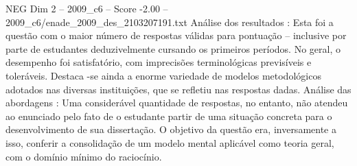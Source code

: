 \begin{textsample}{NEG Dim 2 – 2009\_c6 – Score -2.00 – 2009\_c6/enade\_2009\_des\_2103207191.txt}
Análise dos resultados : Esta foi a questão com o maior número de respostas válidas para pontuação – inclusive por parte de estudantes deduzivelmente cursando os primeiros períodos.
No geral, o desempenho foi satisfatório, com imprecisões terminológicas previsíveis e toleráveis.
Destaca -se ainda a enorme variedade de modelos metodológicos adotados nas diversas instituições, que se refletiu nas respostas dadas.
Análise das abordagens : Uma considerável quantidade de respostas, no entanto, não atendeu ao enunciado pelo fato de o estudante partir de uma situação concreta para o desenvolvimento de sua dissertação.
O objetivo da questão era, inversamente a isso, conferir a consolidação de um modelo mental aplicável como teoria geral, com o domínio mínimo do raciocínio.

\end{textsample}
